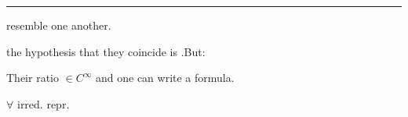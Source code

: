 \noindent\rule{\linewidth}{0.4pt}

resemble one another.

\par\noindent\begin{minipage}{\linewidth}
the hypothesis that they coincide is .\qquad But:





\begin{flushright}\end{flushright}








Their ratio $\in C^\infty$ and one can write a formula.
\end{minipage}





$\forall$ irred. repr.

